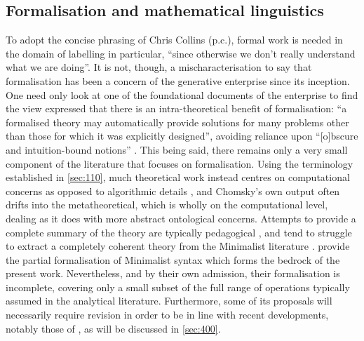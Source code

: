\subsection{Formalisation and mathematical linguistics}\label{sec:120}

To adopt the concise phrasing of Chris Collins (p.c.), formal work is needed in the domain of labelling in particular, ``since otherwise we don't really understand what we are doing''. It is not, though, a mischaracterisation to say that formalisation has been a concern of the generative enterprise since its inception. One need only look at one of the foundational documents of the enterprise to find the view expressed that there is an intra-theoretical benefit of formalisation: ``a formalised theory may automatically provide solutions for many problems other than those for which it was explicitly designed'', avoiding reliance upon ``[o]bscure and intuition-bound notions'' \parencite[5]{ChomskyN_1957}. This being said, there remains only a very small component of the literature that focuses on formalisation. Using the terminology established in \autoref{sec:110}, much theoretical work instead centres on computational concerns  as opposed to algorithmic details , and Chomsky's own output often drifts into the metatheoretical, which is wholly on the computational level, dealing as it does with more abstract ontological concerns. Attempts to provide a complete summary of the theory are typically pedagogical \parencite[for example][]{AdgerD_2003, RadfordA_2004a,HornsteinN.etal_2005,SporticheD.etal_2014}, and tend to struggle to extract a completely coherent theory from the Minimalist literature \parencite{AsudehA.ToivonenI_2006}. \textcite{CollinsC.StablerE_2016} provide the partial formalisation of Minimalist syntax which forms the bedrock of the present work. Nevertheless, and by their own admission, their formalisation is incomplete, covering only a small subset of the full range of operations typically assumed in the analytical literature. Furthermore, some of its proposals will necessarily require revision in order to be in line with recent developments, notably those of \textcite{ChomskyN_2019a,ChomskyN_2021}, as will be discussed in \autoref{sec:400}.

